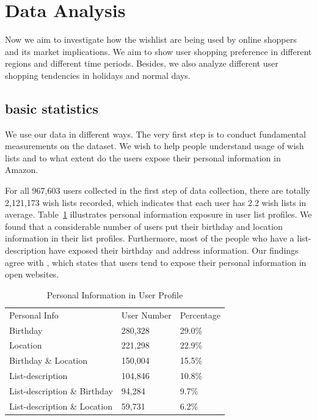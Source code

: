 \section{Data Analysis}




Now we aim to investigate how the wishlist are being used by online shoppers and its market implications. We aim to show user shopping preference in different regions and different time periods. Besides, we also analyze different user shopping tendencies in holidays and normal days.
\subsection{basic statistics}
We use our data in different ways. The very first step is to conduct fundamental measurements on the dataset. We wish to help people understand usage of wish lists and to what extent do the users expose their personal information in Amazon. 

For all 967,603 users collected in the first step of data collection, there are totally 2,121,173 wish lists recorded, which indicates that each user has 2.2 wish lists in average. Table~\ref{tb:stat} illustrates personal information exposure in user list profiles. We found that a considerable number of users put their birthday and location information in their list profiles. Furthermore, most of the people who have a list-description have exposed their birthday and address information. Our findings agree with \cite{frankowski2006you}, which states that users tend to expose their personal information in open websites. 

\begin{table}[!htbp]
\centering
\caption{Personal Information in User Profile}
\label{tb:stat}
\begin{adjustbox}{max width=.5\textwidth}
\begin{tabular}{lll}
Personal Info & User Number & Percentage \\
Birthday & 280,328 & 29.0\% \\
Location & 221,298 & 22.9\% \\
Birthday \& Location & 150,004 & 15.5\% \\
List-description & 104,846 & 10.8\% \\
List-description \& Birthday & 94,284 & 9.7\% \\
List-description \& Location & 59,731 & 6.2\% 
\end{tabular}
\end{adjustbox}
\end{table}




